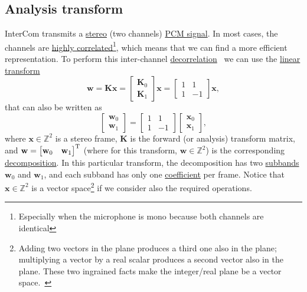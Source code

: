 \subsection{Analysis transform}
\label{sec:analysis_transform}
InterCom transmits a
\href{https://en.wikipedia.org/wiki/Stereophonic_sound}{stereo} (two
channels)
\href{https://en.wikipedia.org/wiki/Pulse-code_modulation}{PCM
  signal}. In most cases, the channels are
\href{https://en.wikipedia.org/wiki/Binaural_recording}{highly
  correlated}\footnote{Especially when the microphone is mono because both
channels are identical}, which means that we can find a more efficient
representation. To perform this inter-channel
\href{https://en.wikipedia.org/wiki/Decorrelation}{decorrelation}~\cite{thinkstats}
we can use the \href{https://en.wikipedia.org/wiki/Linear_map}{linear
  transform}~\cite{strang4linear}
\begin{equation}
  {\mathbf w} = {\mathbf K}{\mathbf x} =
\begin{bmatrix} \mathbf{K}_0 \\ \mathbf{K}_1 \end{bmatrix}{\mathbf x} =
\begin{bmatrix} 1 & 1 \\ 1 & -1 \end{bmatrix}
{\mathbf x},
  \label{eq:forward_transform_matrix_form}
\end{equation}
that can also be written as
\begin{equation}
  \begin{bmatrix}
    {\mathbf w}_0 \\
    {\mathbf w}_1
  \end{bmatrix}
  = 
  \begin{bmatrix} 1 & 1 \\ 1 & -1 \end{bmatrix}
  \begin{bmatrix}
    {\mathbf x}_0 \\
    {\mathbf x}_1
  \end{bmatrix},
  \label{eq:forward_transform_matrix_form2}
\end{equation}
where ${\mathbf x}\in\mathbb{Z}^2$ is a stereo frame, ${\mathbf K}$ is
the forward (or analysis) transform matrix, and
${\mathbf w}=\begin{bmatrix} {\mathbf w}_0 & {\mathbf
    w}_1\end{bmatrix}^{\text T}$ (where for this transform,
$\mathbf{w}\in\mathbb{Z}^2$) is the corresponding
\href{https://en.wikipedia.org/wiki/Discrete_wavelet_transform}{decomposition}. In
this particular transform, the decomposition has two
\href{https://en.wikipedia.org/wiki/Sub-band_coding}{subbands}
${\mathbf w}_0$ and ${\mathbf w}_1$, and each subband has only one
\href{https://web.stanford.edu/class/ee398a/handouts/lectures/07-TransformCoding.pdf}{coefficient}
per frame. Notice that ${\mathbf x}\in\mathbb{Z}^2$ is a vector
space\footnote{Adding two vectors in the plane produces a third one
  also in the plane; multiplying a vector by a real scalar produces a
  second vector also in the plane. These two ingrained facts make the
  integer/real plane be a vector
  space.~\cite{vetterli2014foundations}} if we consider also the
required operations.

